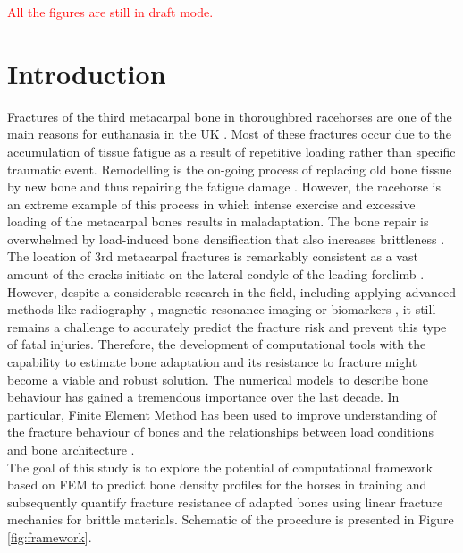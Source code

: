 \documentclass[11pt]{ACMEarticle}
\numberwithin{equation}{section}
\begin{document}
\textcolor{red}{All the figures are still in draft mode.}
\section{Introduction}
Fractures of the third metacarpal bone in thoroughbred racehorses are one of the main reasons for euthanasia in the UK \citep{Parkin2004risk}. Most of these fractures occur due to the accumulation of tissue fatigue as a result of repetitive loading \citep{Parkin2005} rather than specific traumatic event. Remodelling is the on-going process of replacing old bone tissue by new bone and thus repairing the fatigue damage \citep{hughes2017role}. However, the racehorse is an extreme example of this process in which intense exercise and excessive loading of the metacarpal bones results in maladaptation. The bone repair is overwhelmed by load-induced bone densification that also increases brittleness \citep{loughridge2017qualitative}. The location of 3rd metacarpal fractures is remarkably consistent as a vast amount of the cracks initiate on the lateral condyle of the leading forelimb \citep{jacklin2012frequency, parkin2006analysis}. However, despite a considerable research in the field, including applying advanced methods like radiography \citep{crijns2014intramodality, loughridge2017qualitative, bogers2016quantitative}, magnetic resonance imaging \citep{tranquille2017MRI} or biomarkers \citep{mcilwraith2005use}, it still remains a challenge to accurately predict the fracture risk and prevent this type of fatal injuries. Therefore, the development of computational tools with the capability to estimate bone adaptation and its resistance to fracture might become a viable and robust solution. The numerical models to describe bone behaviour has gained a tremendous importance over the last decade. In particular, Finite Element Method has been used to improve understanding of the fracture behaviour of bones and the relationships between load conditions and bone architecture \citep{podshivalov2014road, poelert2013patient}. \\
The goal of this study is to explore the potential of computational framework based on FEM to predict bone density profiles for the horses in training and subsequently quantify fracture resistance of adapted bones using linear fracture mechanics for brittle materials. Schematic of the procedure is presented in Figure \ref{fig:framework}.
\end{document}
